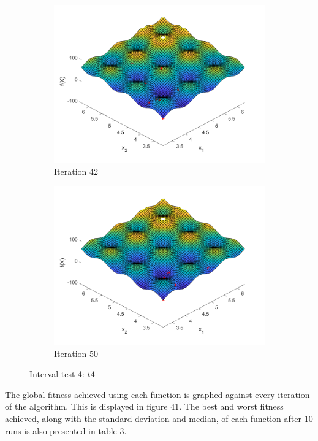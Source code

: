 \begin{figure}
\begin{subfigure}[b]{0.4\textwidth}
   \includegraphics[width=\textwidth]{img/smpl/rast2dshft/loa-iter-42}
   \caption{Iteration 42}
   \label{fig:s3-iter-6}
 \end{subfigure}
 \begin{subfigure}[b]{0.4\textwidth}
   \includegraphics[width=\textwidth]{img/smpl/rast2dshft/loa-iter-50}
   \caption{Iteration 50}
   \label{fig:s3-iter-7}
 \end{subfigure}
 \caption{Interval test 4: $t4$}
\end{figure}

\par The global fitness achieved using each function is graphed against every iteration of the algorithm. This is displayed in figure 41. The best and worst fitness achieved, along with the standard deviation and median, of each function after 10 runs is also presented in table 3. \par

